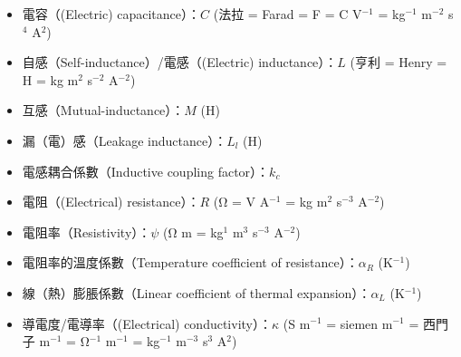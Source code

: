 \documentclass[a4paper,12pt]{report}
\begin{document}
\begin{itemize}
\begin{itemize}
\item 電容（(Electric) capacitance）：$C$ (法拉 = Farad = F = C V$^{-1}$ = kg$^{-1}$ m$^{-2}$ s$^4$ A$^2$)
\item 自感（Self-inductance）/電感（(Electric) inductance）：$L$ (亨利 = Henry = H = kg m$^2$ s$^{-2}$ A$^{-2}$)
\item 互感（Mutual-inductance）：$M$ (H)
\item 漏（電）感（Leakage inductance）：$L_l$ (H)
\item 電感耦合係數（Inductive coupling factor）：$k_c$
\item 電阻（(Electrical) resistance）：$R$ (Ω = V A$^{-1}$ = kg m$^2$ s$^{-3}$ A$^{-2}$)
\item 電阻率（Resistivity）：$\psi$ (Ω m = kg$^1$ m$^3$ s$^{-3}$ A$^{-2}$)
\item 電阻率的溫度係數（Temperature coefficient of resistance）：$\alpha_R$ (K$^{-1}$)
\item 線（熱）膨脹係數（Linear coefficient of thermal expansion）：$\alpha_L$ (K$^{-1}$)
\item 導電度/電導率（(Electrical) conductivity）：$\kappa$ (S m$^{-1}$ = siemen m$^{-1}$ = 西門子 m$^{-1}$ = Ω$^{-1}$ m$^{-1}$ = kg$^{-1}$ m$^{-3}$ s$^3$ A$^2$)
\end{itemize}

\end{itemize}
\end{document}
